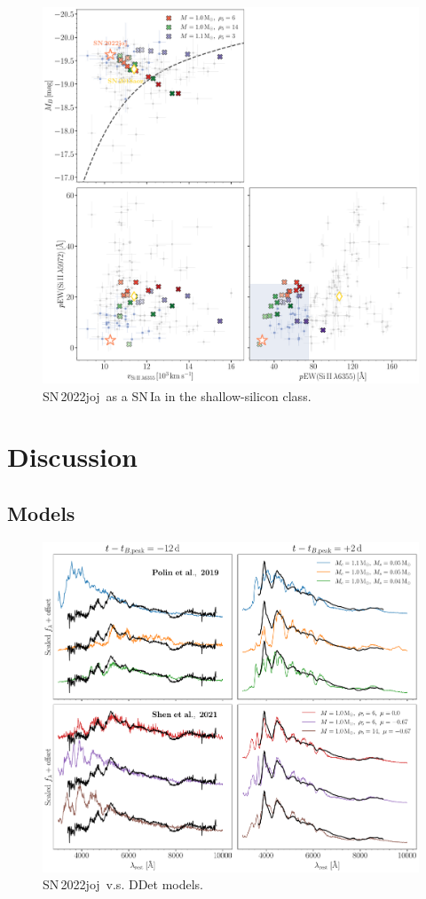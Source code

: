 \documentclass[twocolumn]{aastex631}
\newcommand{\sn}{SN\,2022joj}
\begin{document}
\begin{CJK*}{UTF8}{gbsn}
\begin{figure}
    \centering
    \includegraphics[width=\linewidth]{phase_space.pdf}
    \caption{\sn\ as a SN\,Ia in the shallow-silicon class.}
    \label{fig:phase_space}
\end{figure}

\section{Discussion} \label{sec:discussion}
\subsection{Models} \label{sec:model}
\begin{figure}
    \centering
    \includegraphics[width=\linewidth]{model_comparison_spec.pdf}
    \caption{\sn\ v.s. DDet models.}
    \label{fig:model_spec}
\end{figure}


\end{CJK*}
\end{document}
